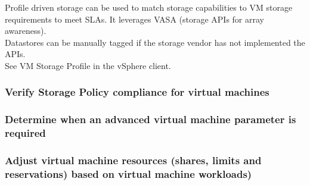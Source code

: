Profile driven storage can be used to match storage capabilities to VM storage
requirements to meet SLAs. It leverages VASA (storage APIs for array
awareness).\\

Datastores can be manually tagged if the storage vendor has not implemented
the APIs.\\

See VM Storage Profile in the vSphere client.

\subsubsection{Verify Storage Policy compliance for virtual machines}

\subsubsection{Determine when an advanced virtual machine parameter is required}

\subsubsection{Adjust virtual machine resources (shares, limits and reservations) based on virtual machine workloads)}
